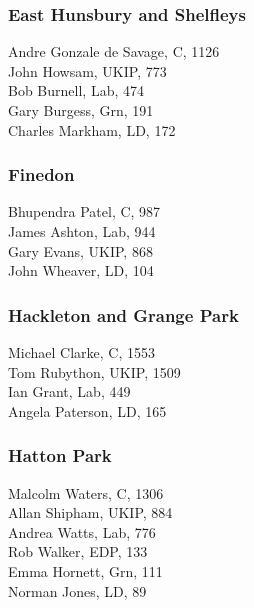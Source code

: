 \documentclass[a4paper,openany,10pt]{book}
\begin{document}
\subsubsection*{East Hunsbury and Shelfleys}



Andre Gonzale de Savage, C, 1126\\
John Howsam, UKIP, 773\\
Bob Burnell, Lab, 474\\
Gary Burgess, Grn, 191\\
Charles Markham, LD, 172\\


\subsubsection*{Finedon}



Bhupendra Patel, C, 987\\
James Ashton, Lab, 944\\
Gary Evans, UKIP, 868\\
John Wheaver, LD, 104\\


\subsubsection*{Hackleton and Grange Park}



Michael Clarke, C, 1553\\
Tom Rubython, UKIP, 1509\\
Ian Grant, Lab, 449\\
Angela Paterson, LD, 165\\


\subsubsection*{Hatton Park}



Malcolm Waters, C, 1306\\
Allan Shipham, UKIP, 884\\
Andrea Watts, Lab, 776\\
Rob Walker, EDP, 133\\
Emma Hornett, Grn, 111\\
Norman Jones, LD, 89\\
\end{document}
